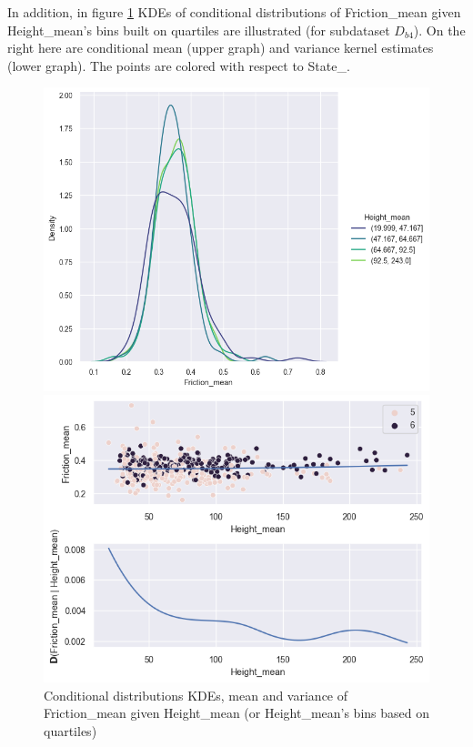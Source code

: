 \documentclass[12pt, bachelor, substylefile = algo_title.rtx]{disser}
\theoremstyle{definition}
\begin{document}
In addition, in figure \ref{fig: 6} KDEs of conditional distributions of Friction\_mean given Height\_mean's bins built on quartiles are illustrated (for subdataset $D_{b4}$). On the right here are conditional mean (upper graph) and variance kernel estimates (lower graph). The points are colored with respect to State\_.

\begin{figure}[!h]
   \begin{minipage}{.48\textwidth}
     \includegraphics[width=\linewidth]{friction_height}
   \end{minipage} \hfill
\begin{minipage}{.48\textwidth}
     \includegraphics[width=\linewidth]{friction_heightm}
   \end{minipage}
\caption{Conditional distributions KDEs, mean and variance of Friction\_mean given Height\_mean (or Height\_mean's bins based on quartiles)}
\label{fig: 6}
\end{figure}
\end{document}
